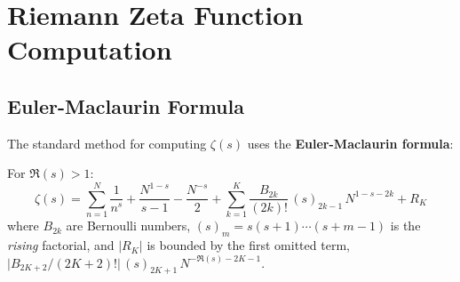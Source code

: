 \section{Riemann Zeta Function Computation}
\label{sec:zeta-computation}

\subsection{Euler-Maclaurin Formula}

The standard method for computing $\zeta(s)$ uses the \textbf{Euler-Maclaurin formula}:

\begin{thm}\label{thm:euler-maclaurin-zeta}
For $\Re(s) > 1$:
\begin{equation}
\zeta(s) = \sum_{n=1}^{N} \frac{1}{n^s} + \frac{N^{1-s}}{s-1} - \frac{N^{-s}}{2}
 + \sum_{k=1}^{K} \frac{B_{2k}}{(2k)!}\,(s)_{2k-1}\, N^{1-s-2k} + R_K
\end{equation}
where $B_{2k}$ are Bernoulli numbers,
$(s)_{m} = s(s+1)\cdots(s+m-1)$ is the \emph{rising} factorial, and
$|R_K|$ is bounded by the first omitted term,
$\bigl|B_{2K+2}/(2K+2)!\bigr|\,(s)_{2K+1}\,N^{-\Re(s)-2K-1}$.
\end{thm}

